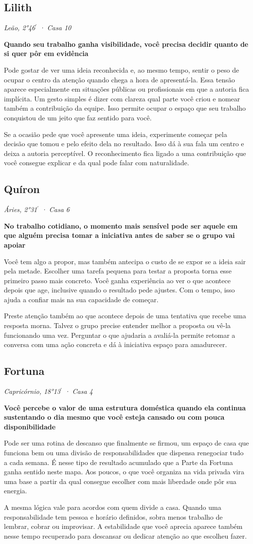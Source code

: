 \documentclass[11pt,a4paper]{article}
\newcommand{\leitura}[3]{\subsection{#1}\textit{#2}\par #3}
\newcommand{\subtituloleitura}[1]{\textbf{#1}\par\nopagebreak[4]}
\begin{document}
\leitura{Lilith}{Leão, 2°46\ensuremath{^{\prime}} · Casa 10}{
\subtituloleitura{Quando seu trabalho ganha visibilidade, você precisa decidir quanto de si quer pôr em evidência} Pode gostar de ver uma ideia reconhecida e, ao mesmo tempo, sentir o peso de ocupar o centro da atenção quando chega a hora de apresentá-la. Essa tensão aparece especialmente em situações públicas ou profissionais em que a autoria fica implícita. Um gesto simples é dizer com clareza qual parte você criou e nomear também a contribuição da equipe. Isso permite ocupar o espaço que seu trabalho conquistou de um jeito que faz sentido para você.

Se a ocasião pede que você apresente uma ideia, experimente começar pela decisão que tomou e pelo efeito dela no resultado. Isso dá à sua fala um centro e deixa a autoria perceptível. O reconhecimento fica ligado a uma contribuição que você consegue explicar e da qual pode falar com naturalidade.
}

\leitura{Quíron}{Áries, 2°31\ensuremath{^{\prime}} · Casa 6}{
\subtituloleitura{No trabalho cotidiano, o momento mais sensível pode ser aquele em que alguém precisa tomar a iniciativa antes de saber se o grupo vai apoiar} Você tem algo a propor, mas também antecipa o custo de se expor se a ideia sair pela metade. Escolher uma tarefa pequena para testar a proposta torna esse primeiro passo mais concreto. Você ganha experiência ao ver o que acontece depois que age, inclusive quando o resultado pede ajustes. Com o tempo, isso ajuda a confiar mais na sua capacidade de começar.

Preste atenção também ao que acontece depois de uma tentativa que recebe uma resposta morna. Talvez o grupo precise entender melhor a proposta ou vê-la funcionando uma vez. Perguntar o que ajudaria a avaliá-la permite retomar a conversa com uma ação concreta e dá à iniciativa espaço para amadurecer.
}

\leitura{Fortuna}{Capricórnio, 18°13\ensuremath{^{\prime}} · Casa 4}{
\subtituloleitura{Você percebe o valor de uma estrutura doméstica quando ela continua sustentando o dia mesmo que você esteja cansado ou com pouca disponibilidade} Pode ser uma rotina de descanso que finalmente se firmou, um espaço de casa que funciona bem ou uma divisão de responsabilidades que dispensa renegociar tudo a cada semana. É nesse tipo de resultado acumulado que a Parte da Fortuna ganha sentido neste mapa. Aos poucos, o que você organiza na vida privada vira uma base a partir da qual consegue escolher com mais liberdade onde pôr sua energia.

A mesma lógica vale para acordos com quem divide a casa. Quando uma responsabilidade tem pessoa e horário definidos, sobra menos trabalho de lembrar, cobrar ou improvisar. A estabilidade que você aprecia aparece também nesse tempo recuperado para descansar ou dedicar atenção ao que escolheu fazer.
}
\end{document}
